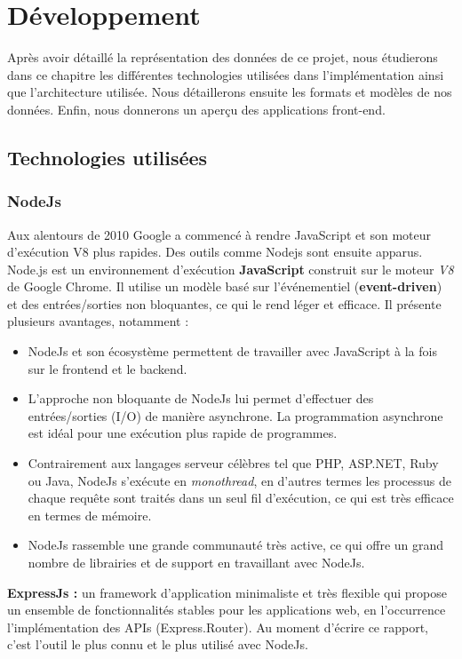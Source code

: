 \chapter{Développement}
Après avoir détaillé la représentation des données de ce projet, nous étudierons dans ce chapitre les différentes technologies utilisées dans l'implémentation ainsi que l'architecture utilisée. Nous détaillerons ensuite les formats et modèles de nos données. Enfin, nous donnerons un aperçu des applications front-end.
\section{Technologies utilisées}
\subsection{NodeJs}
Aux alentours de 2010 Google a commencé à rendre JavaScript et son moteur d'exécution V8 plus rapides. Des outils comme Nodejs sont ensuite apparus\cite{NodeJs}.\newline
Node.js est un environnement d'exécution \textbf{JavaScript} construit sur le moteur \emph{V8} de Google Chrome. Il utilise un modèle basé sur l'événementiel (\textbf{event-driven}) et des entrées/sorties non bloquantes, ce qui le rend léger et efficace.
Il présente plusieurs avantages, notamment :
\begin{itemize}
	\item NodeJs et son écosystème permettent de travailler avec JavaScript à la fois sur le frontend et le backend.
	\item L'approche non bloquante de NodeJs lui permet d'effectuer des entrées/sorties (I/O) de manière asynchrone. La programmation asynchrone est idéal pour une exécution plus rapide de programmes.
	\item Contrairement aux langages serveur célèbres tel que PHP, ASP.NET, Ruby ou Java, NodeJs s'exécute en \emph{monothread}, en d'autres termes les processus de chaque requête sont traités dans un seul fil d'exécution, ce qui est très efficace en termes de mémoire.
	\item NodeJs rassemble une grande communauté très active, ce qui offre un grand nombre de librairies et de support en travaillant avec NodeJs.\newline
\end{itemize}

\textbf{ExpressJs :} un framework d'application minimaliste et très flexible qui propose un ensemble de fonctionnalités stables pour les applications web, en l'occurrence l'implémentation des APIs (Express.Router). Au moment d'écrire ce rapport, c'est l'outil le plus connu et le plus utilisé avec NodeJs.

